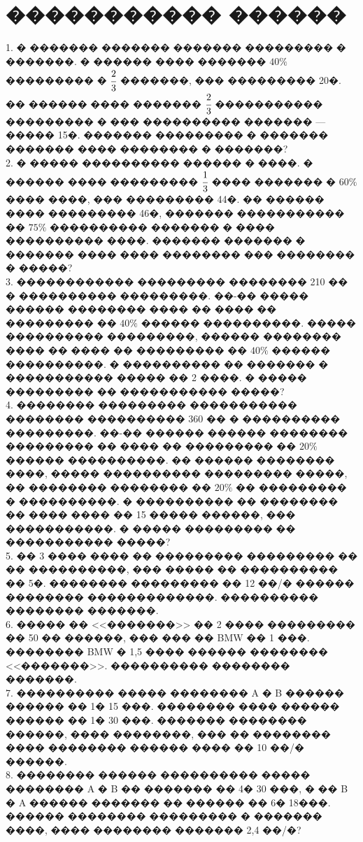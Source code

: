 \documentclass[12pt]{article}
\begin{document}
\section{����������� ������}
1. � ������� ������� ������� ��������� � �������. � ������ ���� ������� $40\%$ ��������� � $\cfrac{2}{3}$ �������, ��� ��������� 20�. �� ������ ���� ������� $\cfrac{2}{3}$ ����������� ��������� � ��� ���������� ������� --- ����� 15�. ������� ��������� � ������� ������� ���� �������� � �������?\\
2. � ����� ���������� ������ � ����. � ������ ���� ��������� $\cfrac{1}{3}$ ���� ������� � $60\%$ ���� ����, ��� ��������� 44�. �� ������ ���� ��������� 46�, ������� ����������� �� $75\%$ ���������� ������� � ���� ���������� ����. ������� ������� � ������� ���� ���� �������� ��� �������� � �����?\\
3. ������������ ��������� �������� 210 �� � ���������� ���������. ��-�� ����� ������ �������� ���� �� ���� �� ��������� �� $40\%$ ������ ����������. ����� ���������� ���������, ������ �������� ���� �� ���� �� ��������� �� $40\%$ ������ ����������. � ���������� �� ������� � ����������� ����� �� 2 ����. � ����� ��������� �� ����������� �����?\\
4. �������� ��������� ����������� �������� ���������� 360 �� � ���������� ���������. ��-�� ������ ������ �������� ��������� �� ���� �� ��������� �� $20\%$ ������ ����������. �� ������ �������� ����, ����� ���������� ��������� �����, �� �������� �������� �� $20\%$ �� ��������� � ����������. � ���������� �� �������� �� ���� ���� �� 15 ����� ������, ��� �����������. � ����� ��������� �� ����������� �����?\\
5. �� 3 ���� ���� �� ��������� ��������� �� �� ����������,  ��� ����� �� ���������� �� 5�. �������� ��������� �� 12 ��/� ������ �������� �������������. ���������� �������� �������.\\
6. ����� �� <<�������>> �� 2 ���� ��������� �� 50 �� ������, ��� ��� �� BMW �� 1 ���. �������� BMW � 1,5 ���� ������ �������� <<�������>>. ���������� �������� �������.\\
7. ���������� ����� �������� A � B ������ ������ �� 1� 15 ���. �������� ���� ������ ������ �� 1� 30 ���. ������� �������� ������, ���� ��������, ��� �� �������� ���� �������� ������ ���� �� 10 ��/� ������.\\
8. �������� ������ ���������� ����� �������� A � B �� ������� �� 4� 30 ���, � �� B � A ������ ������� �� ������ �� 6� 18���. ������ �������� ��������� � ������� ����, ���� �������� ������� 2,4 ��/�?\\
\end{document}
